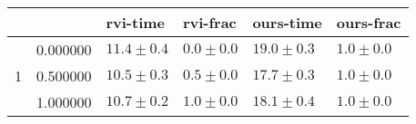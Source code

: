 \begin{tabular}{llllll}
\toprule
 &  & rvi-time & rvi-frac & ours-time & ours-frac \\
\midrule
\multirow[t]{3}{*}{1} & 0.000000 & $11.4 \pm 0.4$ & $0.0 \pm 0.0$ & $19.0 \pm 0.3$ & $1.0 \pm 0.0$ \\
 & 0.500000 & $10.5 \pm 0.3$ & $0.5 \pm 0.0$ & $17.7 \pm 0.3$ & $1.0 \pm 0.0$ \\
 & 1.000000 & $10.7 \pm 0.2$ & $1.0 \pm 0.0$ & $18.1 \pm 0.4$ & $1.0 \pm 0.0$ \\
\cline{1-6}
\bottomrule
\end{tabular}
